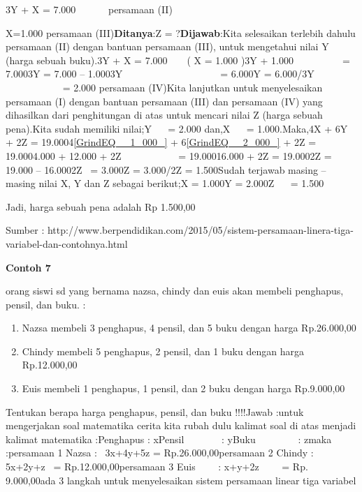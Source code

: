 \documentclass[11pt,fleqn]{book} %
\begin{document}
\noindent 3Y + X                = 7.000 ~ ~ ~~ persamaan (II)

\noindent X=1.000     persamaan (III)\textbf{Ditanya}:Z = ?\textbf{Dijawab}:Kita selesaikan terlebih dahulu persamaan (II) dengan bantuan persamaan (III), untuk mengetahui nilai Y (harga sebuah buku).3Y + X                  = 7.000 ~ ~  ( X = 1.000 )3Y + 1.000 ~ ~ ~ ~ ~~ = 7.0003Y                         = 7.000 -- 1.0003Y ~ ~ ~ ~ ~ ~ ~ ~ ~ ~ ~~  = 6.000Y                           = 6.000/3Y ~ ~ ~ ~ ~ ~ ~ ~ ~ ~ ~ ~  = 2.000         persamaan (IV)Kita lanjutkan untuk menyelesaikan persamaan (I) dengan bantuan persamaan (III) dan persamaan (IV) yang dihasilkan dari penghitungan di atas untuk mencari nilai Z (harga sebuah pena).Kita sudah memiliki nilai;Y ~ ~= 2.000 dan,X ~ ~= 1.000.Maka,4X + 6Y + 2Z                         = 19.0004\eqref{GrindEQ__1_000_} + 6\eqref{GrindEQ__2_000_} + 2Z        = 19.0004.000 + 12.000 + 2Z ~ ~ ~ ~ ~ ~~  = 19.00016.000 + 2Z                            = 19.0002Z                                           = 19.000 -- 16.0002Z~                                          = 3.000Z                                             = 3.000/2Z                                             = 1.500Sudah terjawab masing -- masing nilai X, Y dan Z sebagai berikut;X    = 1.000Y    = 2.000Z ~~ = 1.500

\noindent 

\noindent Jadi, harga sebuah pena adalah Rp 1.500,00

\noindent Sumber : http://www.berpendidikan.com/2015/05/sistem-persamaan-linera-tiga-variabel-dan-contohnya.html

\noindent 

\noindent \textbf{Contoh 7 }

 orang siswi sd yang bernama nazsa, chindy dan euis akan membeli penghapus, pensil, dan buku. :

\begin{enumerate}
\item  Nazsa membeli 3 penghapus, 4 pensil, dan 5 buku dengan harga Rp.26.000,00

\item  Chindy membeli 5 penghapus, 2 pensil, dan 1 buku dengan harga Rp.12.000,00

\item  Euis membeli 1 penghapus, 1 pensil, dan 2 buku dengan harga Rp.9.000,00
\end{enumerate}

\noindent Tentukan berapa harga penghapus, pensil, dan buku !!!!Jawab :untuk mengerjakan soal matematika cerita kita rubah dulu kalimat soal di atas menjadi kalimat matematika :Penghapus : xPensil~~~~~~~ : yBuku~~~~~~~~ : zmaka :persamaan 1 Nazsa :~ 3x+4y+5z = Rp.26.000,00persamaan 2 Chindy : 5x+2y+z~ = Rp.12.000,00persamaan 3 Euis~~~~ : x+y+2z~~~~ = Rp.~ 9.000,00ada 3 langkah untuk menyelesaikan sistem persamaan linear tiga variabel
\end{document}
